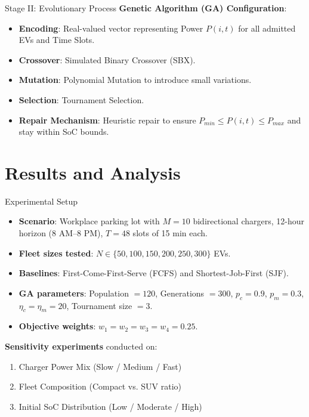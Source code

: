 \documentclass{beamer}
\begin{document}
\begin{frame}{Stage II: Evolutionary Process}
  \textbf{Genetic Algorithm (GA) Configuration}:
  \begin{itemize}
      \item \textbf{Encoding}: Real-valued vector representing Power $P(i,t)$ for all admitted EVs and Time Slots.
      \item \textbf{Crossover}: Simulated Binary Crossover (SBX).
      \item \textbf{Mutation}: Polynomial Mutation to introduce small variations.
      \item \textbf{Selection}: Tournament Selection.
      \item \textbf{Repair Mechanism}: Heuristic repair to ensure $P_{min} \le P(i,t) \le P_{max}$ and stay within SoC bounds.
  \end{itemize}
\end{frame}

\section{Results and Analysis}

\begin{frame}{Experimental Setup}
  \begin{itemize}
      \item \textbf{Scenario}: Workplace parking lot with $M = 10$ bidirectional chargers, 12-hour horizon (8 AM--8 PM), $T = 48$ slots of 15 min each.
      \item \textbf{Fleet sizes tested}: $N \in \{50, 100, 150, 200, 250, 300\}$ EVs.
      \item \textbf{Baselines}: First-Come-First-Serve (FCFS) and Shortest-Job-First (SJF).
      \item \textbf{GA parameters}: Population $= 120$, Generations $= 300$, $p_c = 0.9$, $p_m = 0.3$, $\eta_c = \eta_m = 20$, Tournament size $= 3$.
      \item \textbf{Objective weights}: $w_1 = w_2 = w_3 = w_4 = 0.25$.
  \end{itemize}
  \vspace{0.3cm}
  \textbf{Sensitivity experiments} conducted on:
  \begin{enumerate}
      \item Charger Power Mix (Slow / Medium / Fast)
      \item Fleet Composition (Compact vs. SUV ratio)
      \item Initial SoC Distribution (Low / Moderate / High)
  \end{enumerate}
\end{frame}
\end{document}
